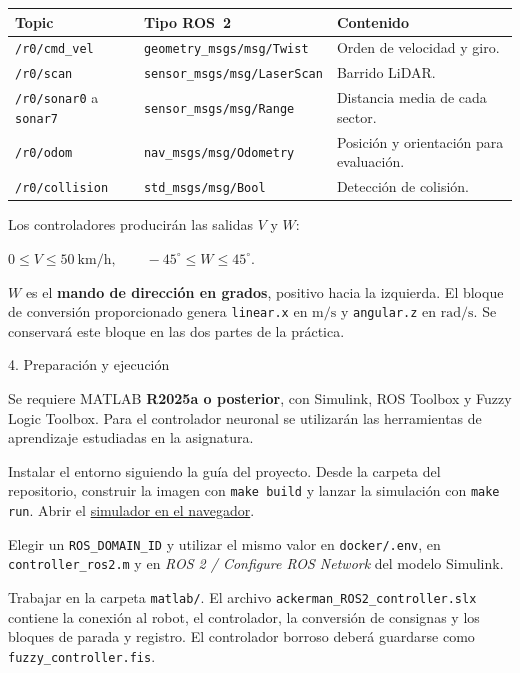 \documentclass[11pt,a4paper]{article}
\newcommand{\problem}[1]{%
  \par\addvspace{4.2mm}%
  {\rmfamily\fontsize{16}{18}\selectfont\color{headingblue}#1\par}%
  \nobreak\vspace{1.6mm}\nobreak
}
\newcommand{\romanitem}[2]{%
  \par\vspace{2mm}%
  \noindent\hangindent=8mm\hangafter=1%
  \makebox[8mm][r]{\textbf{#1.}\hspace{1.5mm}}#2\par
}
\newcommand{\centerEq}[1]{%
  \begin{center}$#1$\end{center}
}
\begin{document}
\begin{center}
\small
\begin{tabularx}{\textwidth}{@{}p{4.1cm} p{5.1cm} X@{}}
\toprule
\textbf{Topic} & \textbf{Tipo ROS~2} & \textbf{Contenido}\\
\midrule
\texttt{/r0/cmd\_vel} & \texttt{geometry\_msgs/msg/Twist}
  & Orden de velocidad y giro.\\
\texttt{/r0/scan} & \texttt{sensor\_msgs/msg/LaserScan}
  & Barrido LiDAR.\\
\texttt{/r0/sonar0} a \texttt{sonar7} & \texttt{sensor\_msgs/msg/Range}
  & Distancia media de cada sector.\\
\texttt{/r0/odom} & \texttt{nav\_msgs/msg/Odometry}
  & Posición y orientación para evaluación.\\
\texttt{/r0/collision} & \texttt{std\_msgs/msg/Bool}
  & Detección de colisión.\\
\bottomrule
\end{tabularx}
\end{center}

Los controladores producirán las salidas $V$ y $W$:
\centerEq{0\leq V\leq50\ \mathrm{km/h},
  \qquad -45^\circ\leq W\leq45^\circ.}
$W$ es el \textbf{mando de dirección en grados}, positivo hacia la izquierda.
El bloque de conversión proporcionado genera \texttt{linear.x} en
$\mathrm{m/s}$ y \texttt{angular.z} en $\mathrm{rad/s}$.
Se conservará este bloque en las dos partes de la práctica.

\newpage
\problem{4. Preparación y ejecución}

Se requiere MATLAB \textbf{R2025a o posterior}, con Simulink,
ROS Toolbox y Fuzzy Logic Toolbox. Para el controlador neuronal
se utilizarán las herramientas de aprendizaje estudiadas en la asignatura.

\romanitem{i}{Instalar el entorno siguiendo la guía del proyecto.
Desde la carpeta del repositorio, construir la imagen con
\texttt{make build} y lanzar la simulación con \texttt{make run}.
Abrir el
\href{http://localhost:6080/vnc.html?autoconnect=true&resize=scale}{simulador en el navegador}.}

\romanitem{ii}{Elegir un \texttt{ROS\_DOMAIN\_ID} y utilizar el mismo
valor en \texttt{docker/.env}, en \texttt{controller\_ros2.m} y en
\textit{ROS 2 / Configure ROS Network} del modelo Simulink.}

\romanitem{iii}{Trabajar en la carpeta \texttt{matlab/}.
El archivo \texttt{ackerman\_ROS2\_controller.slx} contiene la conexión
al robot, el controlador, la conversión de consignas y los bloques de
parada y registro. El controlador borroso deberá guardarse como
\texttt{fuzzy\_controller.fis}.}
\end{document}
